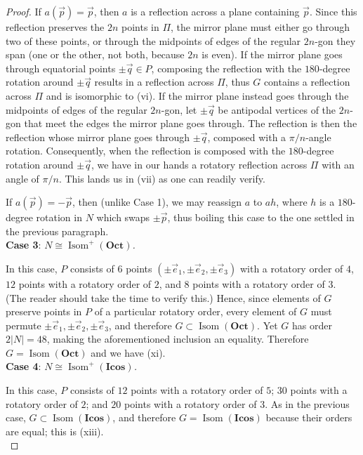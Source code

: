 \documentclass[leqno]{book}
\begin{document}
\begin{proof}
If $a(\vec p)=\vec p$, then $a$ is a reflection across a plane containing $\vec p$.  Since this reflection preserves the $2n$ points in $\Pi$, the mirror plane must either go through two of these points, or through the midpoints of edges of the regular $2n$-gon they span (one or the other, not both, because $2n$ is even).  If the mirror plane goes through equatorial points $\pm\vec q\in P$, composing the reflection with the $180$-degree rotation around $\pm\vec q$ results in a reflection across $\Pi$, thus $G$ contains a reflection across $\Pi$ and is isomorphic to (vi).  If the mirror plane instead goes through the midpoints of edges of the regular $2n$-gon, let $\pm\vec q$ be antipodal vertices of the $2n$-gon that meet the edges the mirror plane goes through.  The reflection is then the reflection whose mirror plane goes through $\pm\vec q$, composed with a $\pi/n$-angle rotation.  Consequently, when the reflection is composed with the $180$-degree rotation around $\pm\vec q$, we have in our hands a rotatory reflection across $\Pi$ with an angle of $\pi/n$.  This lands us in (vii) as one can readily verify.

If $a(\vec p)=-\vec p$, then (unlike Case 1), we may reassign $a$ to $ah$, where $h$ is a $180$-degree rotation in $N$ which swaps $\pm\vec p$, thus boiling this case to the one settled in the previous paragraph.\\

\noindent\textbf{Case 3}: \emph{$N\cong\operatorname{Isom}^+(\mathbf{Oct})$.}

In this case, $P$ consists of $6$ points $(\pm\vec e_1,\pm\vec e_2,\pm\vec e_3)$ with a rotatory order of $4$, $12$ points with a rotatory order of $2$, and $8$ points with a rotatory order of $3$.  (The reader should take the time to verify this.)  Hence, since elements of $G$ preserve points in $P$ of a particular rotatory order, every element of $G$ must permute $\pm\vec e_1,\pm\vec e_2,\pm\vec e_3$, and therefore $G\subset\operatorname{Isom}(\mathbf{Oct})$.  Yet $G$ has order $2|N|=48$, making the aforementioned inclusion an equality.  Therefore $G=\operatorname{Isom}(\mathbf{Oct})$ and we have (xi).\\

\noindent\textbf{Case 4}: \emph{$N\cong\operatorname{Isom}^+(\mathbf{Icos})$.}

In this case, $P$ consists of $12$ points with a rotatory order of $5$; $30$ points with a rotatory order of $2$; and $20$ points with a rotatory order of $3$.  As in the previous case, $G\subset\operatorname{Isom}(\mathbf{Icos})$, and therefore $G=\operatorname{Isom}(\mathbf{Icos})$ because their orders are equal; this is (xiii).\\


\end{proof}
\end{document}
